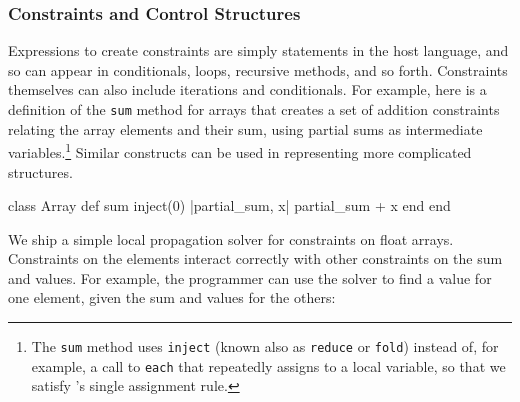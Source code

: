 
\subsubsection{Constraints and Control Structures}
Expressions to create constraints are simply statements in the host
language, and so can appear in conditionals, loops, recursive methods,
and so forth.  Constraints themselves can also include iterations and
conditionals.  For example, here is a definition of the
\lstinline{sum} method for arrays that creates a set of addition
constraints relating the array elements and their sum, using partial
sums as intermediate variables.\footnote{The \lstinline{sum} method
  uses \lstinline{inject} (known also as \lstinline{reduce} or
  \lstinline{fold}) instead of, for example, a call to
  \lstinline{each} that repeatedly assigns to a local variable, so
  that we satisfy \langname's single assignment rule.} Similar
constructs can be used in representing more complicated structures.

\begin{code}
class Array
  def sum
    inject(0) { |partial_sum, x| partial_sum + x }
  end
end
\end{code}


We ship a simple local propagation solver for constraints on float
arrays. Constraints on the elements interact correctly with other
constraints on the sum and values.  For example, the programmer can
use the solver to find a value for one element, given the sum and
values for the others:

